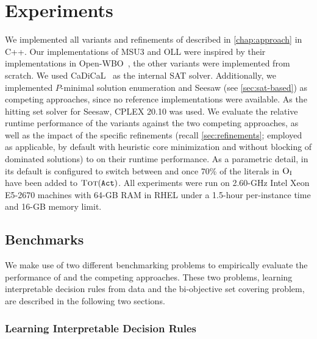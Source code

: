 \chapter{Experiments\label{chap:experiments}}

We implemented  all variants and refinements of \algname{} described in \cref{chap:approach} in C++.
Our implementations of MSU3 and OLL were inspired by their implementations in Open-WBO~\autocite{DBLP:conf/sat/MartinsML14}, the other variants were implemented from scratch.
We used CaDiCaL~\autocite{BiereFazekasFleuryHeisinger-SAT-Competition-2020-solvers} as the internal SAT solver.
Additionally, we implemented $P$-minimal solution enumeration and Seesaw (see \cref{sec:sat-based}) as competing approaches, since no reference implementations were available.
As the hitting set solver for Seesaw, CPLEX 20.10 was used.
We evaluate the relative runtime performance of the \algname{} variants against the two competing approaches, as well as the impact of the specific refinements (recall \cref{sec:refinements}; employed as applicable, by default with heuristic core minimization and without blocking of dominated solutions) to \algname{} on their runtime performance.
As a parametric detail, in its default \msh{} is configured to switch between \msu{} and \satunsat{} once 70\% of the literals in $\textsc{O}_{\text{I}}$ have been added to $\textsc{Tot}(\texttt{Act})$.
All experiments were run on 2.60-GHz Intel Xeon E5-2670 machines with 64-GB RAM in RHEL under a 1.5-hour per-instance time and 16-GB memory limit.

\section{Benchmarks\label{sec:benchmarks}}

We make use of two different benchmarking problems to empirically evaluate the performance of \algname{} and the competing approaches.
These two problems, learning interpretable decision rules from data and the bi-objective set covering problem, are described in the following two sections.

\subsection{Learning Interpretable Decision Rules\label{sec:lidr}}

